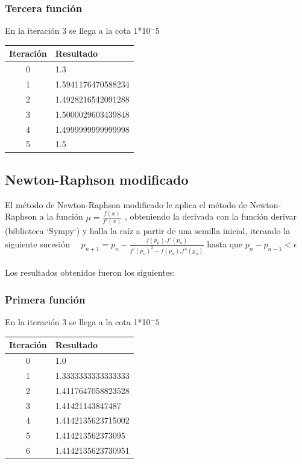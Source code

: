 \documentclass[titlepage,a4paper]{article}
\begin{document}
\subsubsection{Tercera función}\label{sec:NR3}
En la iteración 3 se llega a la cota 1*10$^-5$
\begin{center}
    \begin{tabular}{| c | l |}
    \hline
     Iteración & Resultado \\ \hline
   0     &  1.3 \\
1     &  1.5941176470588234 \\
2     &  1.4928216542091288 \\
3     &  1.5000029603439848 \\
4     &  1.4999999999999998 \\
5     &  1.5 \\
    \hline
    \end{tabular}
\end{center}
\subsection{Newton-Raphson modificado}\label{sec:biseccion}

El método de Newton-Raphson modificado le aplica el método de Newton-Raphson a la función $\mu =\frac{f (x)}{f'(x)}$
, obteniendo la derivada con la función derivar (biblioteca `Sympy`) y halla la raíz a partir de una semilla inicial, iterando la siguiente sucesión
$
\quad p_{n+1}=p_n-\frac{f(p_n).f'(p_n)} {f'(p_n)^2-f(p_n).f''(p_n)}
 $ hasta que $
p_{n}-p_{n-1} < \mbox{$\epsilon$}
$
\\\\Los resultados obtenidos fueron los siguientes:
\subsubsection{Primera función}\label{sec:NRM1}
En la iteración 3 se llega a la cota 1*10$^-5$
\begin{center}
    \begin{tabular}{| c | l |}
    \hline
     Iteración & Resultado \\ \hline
   0     &  1.0 \\
1     &  1.3333333333333333 \\
2     &  1.4117647058823528 \\
3     &  1.41421143847487 \\
4     &  1.4142135623715002 \\
5     &  1.414213562373095 \\
6     &  1.4142135623730951 \\
    \hline
    \end{tabular}
\end{center}
\end{document}
